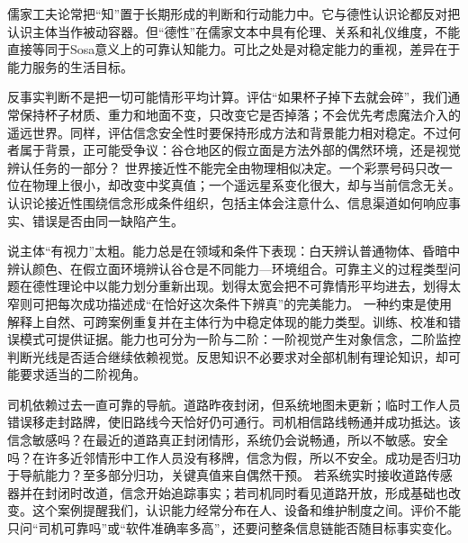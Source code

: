 \begin{comparison}
儒家工夫论常把“知”置于长期形成的判断和行动能力中。它与德性认识论都反对把认识主体当作被动容器。但“德性”在儒家文本中具有伦理、关系和礼仪维度，不能直接等同于Sosa意义上的可靠认知能力。可比之处是对稳定能力的重视，差异在于能力服务的生活目标。
\end{comparison}

反事实判断不是把一切可能情形平均计算。评估“如果杯子掉下去就会碎”，我们通常保持杯子材质、重力和地面不变，只改变它是否掉落；不会优先考虑魔法介入的遥远世界。同样，评估信念安全性时要保持形成方法和背景能力相对稳定。不过何者属于背景，正可能受争议：谷仓地区的假立面是方法外部的偶然环境，还是视觉辨认任务的一部分？ 世界接近性不能完全由物理相似决定。一个彩票号码只改一位在物理上很小，却改变中奖真值；一个遥远星系变化很大，却与当前信念无关。认识论接近性围绕信念形成条件组织，包括主体会注意什么、信息渠道如何响应事实、错误是否由同一缺陷产生。

说主体“有视力”太粗。能力总是在领域和条件下表现：白天辨认普通物体、昏暗中辨认颜色、在假立面环境辨认谷仓是不同能力—环境组合。可靠主义的过程类型问题在德性理论中以能力划分重新出现。划得太宽会把不可靠情形平均进去，划得太窄则可把每次成功描述成“在恰好这次条件下辨真”的完美能力。 一种约束是使用解释上自然、可跨案例重复并在主体行为中稳定体现的能力类型。训练、校准和错误模式可提供证据。能力也可分为一阶与二阶：一阶视觉产生对象信念，二阶监控判断光线是否适合继续依赖视觉。反思知识不必要求对全部机制有理论知识，却可能要求适当的二阶视角。

司机依赖过去一直可靠的导航。道路昨夜封闭，但系统地图未更新；临时工作人员错误移走封路牌，使旧路线今天恰好仍可通行。司机相信路线畅通并成功抵达。该信念敏感吗？在最近的道路真正封闭情形，系统仍会说畅通，所以不敏感。安全吗？在许多近邻情形中工作人员没有移牌，信念为假，所以不安全。成功是否归功于导航能力？至多部分归功，关键真值来自偶然干预。 若系统实时接收道路传感器并在封闭时改道，信念开始追踪事实；若司机同时看见道路开放，形成基础也改变。这个案例提醒我们，认识能力经常分布在人、设备和维护制度之间。评价不能只问“司机可靠吗”或“软件准确率多高”，还要问整条信息链能否随目标事实变化。
